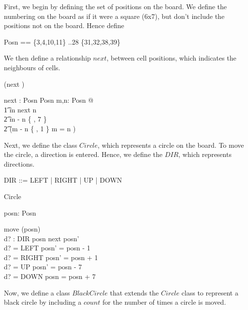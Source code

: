 \documentclass[11pt,a4paper]{article}
\begin{document}
\noindent

First, we begin by defining the set of positions on the board. We define
the numbering on the board as if it were a square (6x7), but don't include
the positions not on the board. Hence define
\begin{zed}
  Posn == \{3,4,10,11\} ..28 \cup \{31,32,38,39\}
\end{zed}

We then define a relationship $next$, between cell positions, which
indicates the neighbours of cells.
\begin{zed}
 \relation (\varg next \varg)
\end{zed}

\begin{axdef}
  \varg next \varg : Posn \rel Posn
\where
  \forall m,n: Posn @ \\
    \t1 m next n \iff \\
       \t2 m - n \in \{ , 7 \} \lor \\
       \t2 (m - n \in \{  , 1 \} \land m  = n )
\end{axdef}

Next, we define the class $Circle$, which represents a circle on the
board. To move the circle, a direction is entered. Hence, we define the
$DIR$, which represents directions.

\begin{zed}
  DIR ::= LEFT | RIGHT | UP | DOWN
\end{zed}

\begin{class}{Circle}
\also
\begin{state}
  posn: Posn
\end{state} 
\begin{op}{move}
  \Delta(posn) \\
  d? : DIR
\where
  posn next posn' \\
  d? = LEFT \implies posn' = posn - 1 \\
  d? = RIGHT \implies posn' = posn + 1 \\
  d? = UP \implies posn' = posn - 7 \\
  d? = DOWN \implies posn = posn + 7 \\
\end{op}
\end{class}

Now, we define a class $BlackCircle$ that extends the $Circle$ class to
represent a black circle by including a $count$ for the number of times a
circle is moved.
\end{document}
